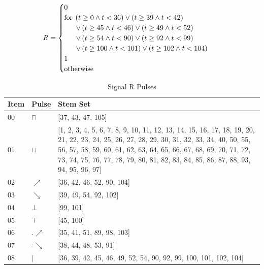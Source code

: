 \documentclass[10pt,journal]{IEEEtran}
\begin{document}
\begin{equation}
 \begin{minipage}{250pt}
\begin{flushleft} $\displaystyle R = \begin{cases} 0 & \\  \text{for}\: \left(t \geq 0 \wedge t < 36\right) \vee \left(t \geq 39 \wedge t < 42\right) \\ \quad \ \  \vee \left(t \geq 45 \wedge t < 46\right) \vee \left(t \geq 49 \wedge t < 52\right) \\ \quad \ \  \vee \left(t \geq 54 \wedge t < 90\right) \vee \left(t \geq 92 \wedge t < 99\right) \\ \quad \ \  \vee \left(t \geq 100 \wedge t < 101\right) \vee \left(t \geq 102 \wedge t < 104\right) \\1 & \\  \text{otherwise} \end{cases}$  \end{flushleft}
 \end{minipage}
 \end{equation}
\begin{table}[H] \caption{Signal R Pulses}\centering\begin{tabular}{|p{.4cm}|p{.5cm}|p{6.5cm}|}\hline Item&Pulse &Stem Set\\ \hline 00& \footnotesize$\sqcap$ & \footnotesize[37, 43, 47, 105]\\ \hline 01& \footnotesize$\sqcup$ & \footnotesize[1, 2, 3, 4, 5, 6, 7, 8, 9, 10, 11, 12, 13, 14, 15, 16, 17, 18, 19, 20, 21, 22, 23, 24, 25, 26, 27, 28, 29, 30, 31, 32, 33, 34, 40, 50, 55, 56, 57, 58, 59, 60, 61, 62, 63, 64, 65, 66, 67, 68, 69, 70, 71, 72, 73, 74, 75, 76, 77, 78, 79, 80, 81, 82, 83, 84, 85, 86, 87, 88, 93, 94, 95, 96, 97]\\ \hline 02& \footnotesize$\nearrow$ & \footnotesize[36, 42, 46, 52, 90, 104]\\ \hline 03& \footnotesize$\searrow$ & \footnotesize[39, 49, 54, 92, 102]\\ \hline 04& \footnotesize$\bot$ & \footnotesize[99, 101]\\ \hline 05& \footnotesize$\top$ & \footnotesize[45, 100]\\ \hline 06& \footnotesize$.\nearrow$ & \footnotesize[35, 41, 51, 89, 98, 103]\\ \hline 07& \footnotesize$^.\searrow$ & \footnotesize[38, 44, 48, 53, 91]\\ \hline 08& \footnotesize$|$ & \footnotesize[36, 39, 42, 45, 46, 49, 52, 54, 90, 92, 99, 100, 101, 102, 104]\\ \hline \end{tabular} \end{table} 
\end{document}
